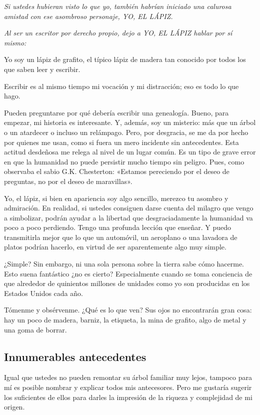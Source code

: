 \documentclass[12pt,a4paper,twoside]{book}
\begin{document}
\textit{Si ustedes hubieran visto lo que yo, también habrían iniciado una calurosa amistad con ese asombroso personaje, YO, EL LÁPIZ.}

\textit{Al ser un escritor por derecho propio, dejo a YO, EL LÁPIZ hablar por sí mismo:}

Yo soy un lápiz de grafito, el típico lápiz de madera tan conocido por todos los que saben leer y escribir.

Escribir es al mismo tiempo mi vocación y mi distracción; eso es todo lo que hago.

Pueden preguntarse por qué debería escribir una genealogía. Bueno, para empezar, mi historia es interesante. Y, además, soy un misterio: más que un árbol o un atardecer o incluso un relámpago. Pero, por desgracia, se me da por hecho por quienes me usan, como si fuera un mero incidente sin antecedentes. Esta actitud desdeñosa me relega al nivel de un lugar común. Es un tipo de grave error en que la humanidad no puede persistir mucho tiempo sin peligro. Pues, como observaba el sabio G.K. Chesterton: «Estamos pereciendo por el deseo de preguntas, no por el deseo de maravillas».

Yo, el lápiz, si bien en apariencia soy algo sencillo, merezco tu asombro y admiración. En realidad, si ustedes consiguen darse cuenta del milagro que vengo a simbolizar, podrán ayudar a la libertad que desgraciadamente la humanidad va poco a poco perdiendo. Tengo una profunda lección que enseñar. Y puedo transmitirla mejor que lo que un automóvil, un aeroplano o una lavadora de platos podrían hacerlo, en virtud de ser aparentemente algo muy simple.

¿Simple? Sin embargo, ni una sola persona sobre la tierra sabe cómo hacerme. Esto suena fantástico ¿no es cierto? Especialmente cuando se toma conciencia de que alrededor de quinientos millones de unidades como yo son producidas en los Estados Unidos cada año.

Tómenme y obsérvenme. ¿Qué es lo que ven? Sus ojos no encontrarán gran cosa: hay un poco de madera, barniz, la etiqueta, la mina de grafito, algo de metal y una goma de borrar.

\subsection{Innumerables antecedentes}
Igual que ustedes no pueden remontar su árbol familiar muy lejos, tampoco para mí es posible nombrar y explicar todos mis antecesores. Pero me gustaría sugerir los suficientes de ellos para darles la impresión de la riqueza y complejidad de mi origen.
\end{document}
